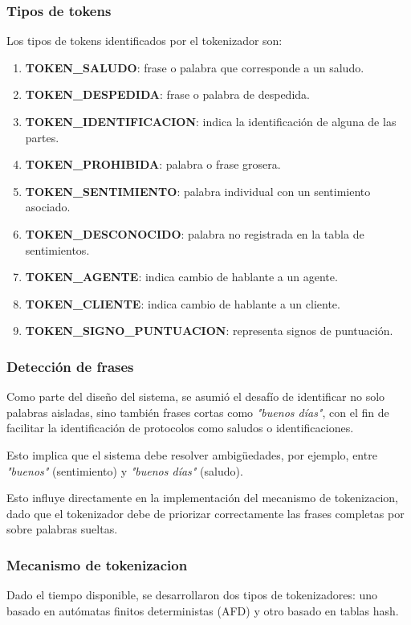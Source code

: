 \subsubsection{Tipos de tokens}
Los tipos de tokens identificados por el tokenizador son:

\begin{enumerate}
	\item {\footnotesize\textbf{TOKEN\_SALUDO}}: frase o palabra que corresponde a un saludo.
	\item {\footnotesize\textbf{TOKEN\_DESPEDIDA}}: frase o palabra de despedida.
	\item {\footnotesize\textbf{TOKEN\_IDENTIFICACION}}: indica la identificación de alguna de las partes.
	\item {\footnotesize\textbf{TOKEN\_PROHIBIDA}}: palabra o frase grosera.
	\item {\footnotesize\textbf{TOKEN\_SENTIMIENTO}}: palabra individual con un sentimiento asociado.
	\item {\footnotesize\textbf{TOKEN\_DESCONOCIDO}}: palabra no registrada en la tabla de sentimientos.
	\item {\footnotesize\textbf{TOKEN\_AGENTE}}: indica cambio de hablante a un agente.
	\item {\footnotesize\textbf{TOKEN\_CLIENTE}}: indica cambio de hablante a un cliente.
	\item {\footnotesize\textbf{TOKEN\_SIGNO\_PUNTUACION}}: representa signos de puntuación.
\end{enumerate}

\subsubsection{Detección de frases}
Como parte del diseño del sistema, se asumió el desafío de identificar no solo palabras
aisladas, sino también frases cortas como \textit{"buenos días"}, con el fin de facilitar la
identificación de protocolos como saludos o identificaciones.

Esto implica que el sistema debe resolver ambigüedades, por ejemplo, entre \textit{"buenos"}
(sentimiento) y \textit{"buenos días"} (saludo).

Esto influye directamente en la implementación del mecanismo de tokenizacion, dado que el
tokenizador debe de priorizar correctamente las frases completas por sobre palabras sueltas.

\subsubsection{Mecanismo de tokenizacion}
Dado el tiempo disponible, se desarrollaron dos tipos de tokenizadores: uno basado en autómatas
finitos deterministas (AFD) y otro basado en tablas hash.

